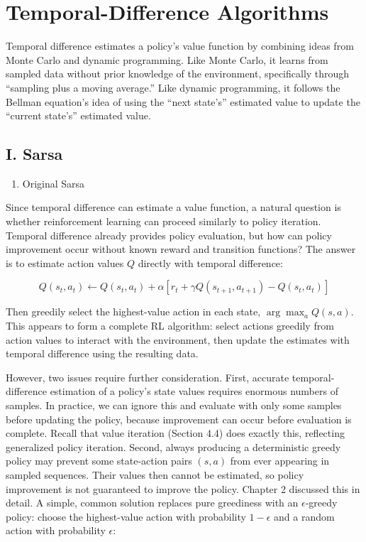 \setcounter{section}{2}

\hypertarget{temporal-difference-algorithms}{%
\section{Temporal-Difference Algorithms}\label{temporal-difference-algorithms}}

Temporal difference estimates a policy's value function by combining ideas from Monte Carlo and dynamic programming. Like Monte Carlo, it learns from sampled data without prior knowledge of the environment, specifically through ``sampling plus a moving average.'' Like dynamic programming, it follows the Bellman equation's idea of using the ``next state's'' estimated value to update the ``current state's'' estimated value.

\hypertarget{i.-sarsa}{%
\subsection{I. Sarsa}\label{i.-sarsa}}

\begin{enumerate}
\def\labelenumi{\arabic{enumi}.}
\tightlist
\item
  Original Sarsa
\end{enumerate}

Since temporal difference can estimate a value function, a natural question is whether reinforcement learning can proceed similarly to policy iteration. Temporal difference already provides policy evaluation, but how can policy improvement occur without known reward and transition functions? The answer is to estimate action values \(Q\) directly with temporal difference:

\[
Q(s_t,a_t)\leftarrow Q(s_t,a_t)+\alpha[r_t+\gamma Q(s_{t+1},a_{t+1})-Q(s_t,a_t)]
\]

Then greedily select the highest-value action in each state, \(\arg\max_a Q(s,a)\). This appears to form a complete RL algorithm: select actions greedily from action values to interact with the environment, then update the estimates with temporal difference using the resulting data.

However, two issues require further consideration. First, accurate temporal-difference estimation of a policy's state values requires enormous numbers of samples. In practice, we can ignore this and evaluate with only some samples before updating the policy, because improvement can occur before evaluation is complete. Recall that value iteration (Section 4.4) does exactly this, reflecting generalized policy iteration. Second, always producing a deterministic greedy policy may prevent some state-action pairs \((s,a)\) from ever appearing in sampled sequences. Their values then cannot be estimated, so policy improvement is not guaranteed to improve the policy. Chapter 2 discussed this in detail. A simple, common solution replaces pure greediness with an \(\epsilon\)-greedy policy: choose the highest-value action with probability \(1-\epsilon\) and a random action with probability \(\epsilon\):

